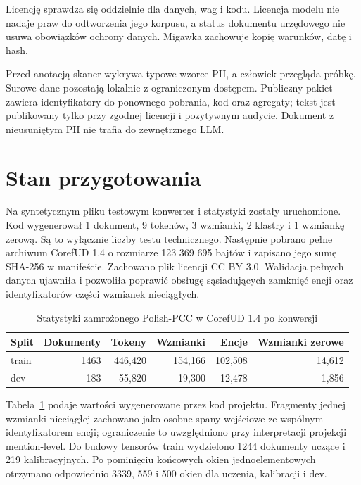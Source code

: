 Licencję sprawdza się oddzielnie dla danych, wag i kodu. Licencja modelu nie nadaje praw do odtworzenia jego korpusu, a status dokumentu urzędowego nie usuwa obowiązków ochrony danych. Migawka zachowuje kopię warunków, datę i hash.

Przed anotacją skaner wykrywa typowe wzorce PII, a człowiek przegląda próbkę. Surowe dane pozostają lokalnie z ograniczonym dostępem. Publiczny pakiet zawiera identyfikatory do ponownego pobrania, kod oraz agregaty; tekst jest publikowany tylko przy zgodnej licencji i pozytywnym audycie. Dokument z nieusuniętym PII nie trafia do zewnętrznego LLM.

\section{Stan przygotowania}
\label{sec:stan-danych}

Na syntetycznym pliku testowym konwerter i statystyki zostały uruchomione. Kod wygenerował 1 dokument, 9 tokenów, 3 wzmianki, 2 klastry i 1 wzmiankę zerową. Są to wyłącznie liczby testu technicznego. Następnie pobrano pełne archiwum CorefUD 1.4 o rozmiarze 123 369 695 bajtów i zapisano jego sumę SHA-256 w manifeście. Zachowano plik licencji CC BY 3.0. Walidacja pełnych danych ujawniła i pozwoliła poprawić obsługę sąsiadujących zamknięć encji oraz identyfikatorów części wzmianek nieciągłych.

\begin{table}[htbp]
  \centering
  \caption{Statystyki zamrożonego Polish-PCC w CorefUD 1.4 po konwersji}
  \label{tab:statystyki-pcc-real}
  \begin{tabular}{lrrrrr}
    \toprule
    Split & Dokumenty & Tokeny & Wzmianki & Encje & Wzmianki zerowe \\
    \midrule
    train & 1463 & 446,420 & 154,166 & 102,508 & 14,612 \\
    dev & 183 & 55,820 & 19,300 & 12,478 & 1,856 \\
    \bottomrule
  \end{tabular}
\end{table}

Tabela~\ref{tab:statystyki-pcc-real} podaje wartości wygenerowane przez kod projektu. Fragmenty jednej wzmianki nieciągłej zachowano jako osobne spany wejściowe ze wspólnym identyfikatorem encji; ograniczenie to uwzględniono przy interpretacji projekcji mention-level. Do budowy tensorów train wydzielono 1244 dokumenty uczące i 219 kalibracyjnych. Po pominięciu końcowych okien jednoelementowych otrzymano odpowiednio 3339, 559 i 500 okien dla uczenia, kalibracji i dev.

